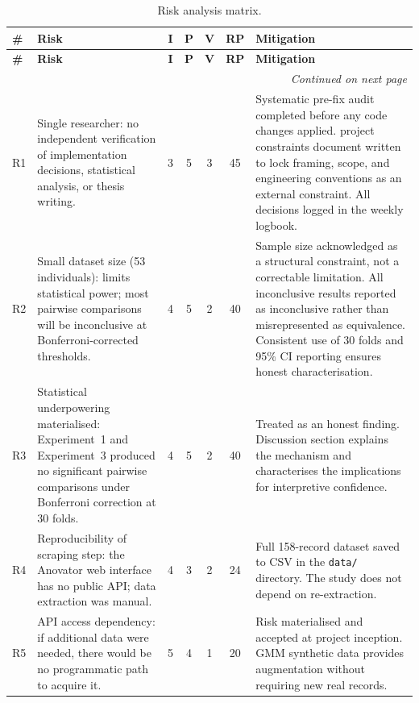 \documentclass[11pt,a4paper]{article}
\begin{document}
\begin{longtable}{p{0.3cm} p{5.5cm} c c c c p{5.5cm}}
  \caption{Risk analysis matrix.}
  \label{tab:risks} \\
  \toprule
  \textbf{\#} & \textbf{Risk} & \textbf{I} & \textbf{P} & \textbf{V} & \textbf{RP} & \textbf{Mitigation} \\
  \midrule
  \endfirsthead
  \toprule
  \textbf{\#} & \textbf{Risk} & \textbf{I} & \textbf{P} & \textbf{V} & \textbf{RP} & \textbf{Mitigation} \\
  \midrule
  \endhead
  \midrule
  \multicolumn{7}{r}{\small\textit{Continued on next page}} \\
  \endfoot
  \bottomrule
  \endlastfoot
  R1 & Single researcher: no independent verification of implementation decisions, statistical analysis, or thesis writing. & 3 & 5 & 3 & 45 &
    Systematic pre-fix audit completed before any code changes applied. project constraints document written to lock framing, scope, and engineering conventions as an external constraint. All decisions logged in the weekly logbook. \\[4pt]
  R2 & Small dataset size (53 individuals): limits statistical power; most pairwise comparisons will be inconclusive at Bonferroni-corrected thresholds. & 4 & 5 & 2 & 40 &
    Sample size acknowledged as a structural constraint, not a correctable limitation. All inconclusive results reported as inconclusive rather than misrepresented as equivalence. Consistent use of 30 folds and 95\% CI reporting ensures honest characterisation. \\[4pt]
  R3 & Statistical underpowering materialised: Experiment~1 and Experiment~3 produced no significant pairwise comparisons under Bonferroni correction at 30 folds. & 4 & 5 & 2 & 40 &
    Treated as an honest finding. Discussion section explains the mechanism and characterises the implications for interpretive confidence. \\[4pt]
  R4 & Reproducibility of scraping step: the Anovator web interface has no public API; data extraction was manual. & 4 & 3 & 2 & 24 &
    Full 158-record dataset saved to CSV in the \texttt{data/} directory. The study does not depend on re-extraction. \\[4pt]
  R5 & API access dependency: if additional data were needed, there would be no programmatic path to acquire it. & 5 & 4 & 1 & 20 &
    Risk materialised and accepted at project inception. GMM synthetic data provides augmentation without requiring new real records. \\[4pt]

\end{longtable}
\end{document}

